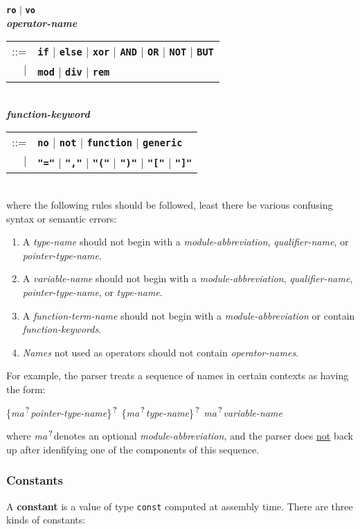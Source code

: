 \documentclass[12pt]{article}
\newcommand{\TT}[1]{{\tt \bfseries #1}}
\newcommand{\QMARK}{{$^{\,\mbox{\footnotesize ?}}$}}
\newcommand{\MA}{{\em ma}\QMARK}
\newcommand{\key}[1]{{\rm \bfseries #1}}
\newcommand{\ttkey}[1]{{\tt \bfseries #1}}
\newcommand{\emkey}[1]{{\em \bfseries #1}}
\newenvironment{indpar}[1][0.3in]%
	{\begin{list}{}%
		     {\setlength{\itemsep}{0in}%
		      \setlength{\topsep}{0in}%
		      \setlength{\parsep}{1ex}%
		      \setlength{\labelwidth}{#1}%
		      \setlength{\leftmargin}{#1}%
		      \addtolength{\leftmargin}{\labelsep}}%
	 \item}%
	{\end{list}}
\begin{document}
\begin{indpar}
    \ttkey{ro} $|$ \ttkey{vo}
\\[1ex]
\emkey{operator-name}
    \begin{tabular}[t]{rl}
    ::= & \TT{if} $|$ \TT{else}
                  $|$ \TT{xor} $|$ \TT{AND} $|$ \TT{OR}
		  $|$ \TT{NOT} $|$ \TT{BUT}  \\
    $|$ & \TT{mod} $|$ \TT{div} $|$ \TT{rem}
    \end{tabular}
\\[1ex]
\emkey{function-keyword}
    \begin{tabular}[t]{rl}
    ::= & \TT{no} $|$ \TT{not} $|$ \TT{function} $|$ \TT{generic} \\
    $|$ & \TT{"="} $|$ \TT{","} $|$ \TT{"("} $|$ \TT{")"} $|$
          \TT{"["} $|$ \TT{"]"}
    \end{tabular}
\\[1ex]
where the following rules should be followed, least there be
various confusing syntax or semantic errors:
\begin{enumerate}
\item
A {\em type-name} should not begin with a {\em module-abbreviation},
{\em qualifier-name}, or {\em pointer-type-name}.
\item
\label{VARIABLE-NAME-RULE}
A {\em variable-name} should not begin with a {\em module-abbreviation},
{\em qualifier-name}, {\em pointer-type-name}, or {\em type-name}.
\item
A {\em function-term-name} should not begin with a {\em module-abbreviation}
or contain {\em function-keywords}.
\item
{\em Names} not used as operators should not contain {\em operator-names}.
\end{enumerate}
\end{indpar}

For example,
the parser treats a sequence of
names in certain contexts as having the form:
\begin{center}
\{\MA {\em pointer-type-name}\}\QMARK{}
\{\MA {\em type-name}\}\QMARK{}
\MA {\em variable-name}
\end{center}
where \MA denotes an optional {\em module-abbreviation},
and the parser does \underline{not} back up after idenfifying
one of the components of this sequence.

\subsubsection{Constants}
\label{CONSTANTS}

A \key{constant} is a value of type {\tt const} computed at
assembly time.  There are three kinds of constants:
\end{document}
